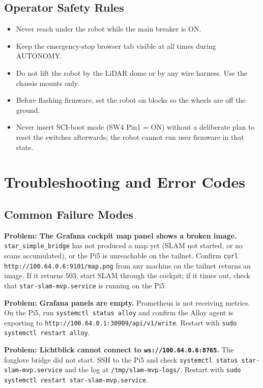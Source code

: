 \documentclass[11pt,letterpaper]{article}
\begin{document}
\subsection{Operator Safety Rules}
\begin{itemize}[leftmargin=1.4em,itemsep=2pt]
\item Never reach under the robot while the main breaker is ON.
\item Keep the emergency-stop browser tab visible at all times
      during AUTONOMY.
\item Do not lift the robot by the LiDAR dome or by any wire
      harness. Use the chassis mounts only.
\item Before flashing firmware, set the robot on blocks so the
      wheels are off the ground.
\item Never insert SCI-boot mode (SW4 Pin1 = ON) without a
      deliberate plan to reset the switches afterwards; the robot
      cannot run user firmware in that state.
\end{itemize}

\section{Troubleshooting and Error Codes}
\label{sec:trouble}

\subsection{Common Failure Modes}

\textbf{Problem: The Grafana cockpit map panel shows a broken image.}
\texttt{star\_simple\_bridge} has not produced a map yet (SLAM not
started, or no scans accumulated), or the Pi5 is unreachable on the
tailnet. Confirm
\texttt{curl http://100.64.0.6:9101/map.png} from any machine on
the tailnet returns an image. If it returns 503, start SLAM through
the cockpit; if it times out, check that
\texttt{star-slam-mvp.service} is running on the Pi5.

\textbf{Problem: Grafana panels are empty.} Prometheus is not
receiving metrics. On the Pi5, run
\texttt{systemctl status alloy} and confirm the Alloy agent is
exporting to
\texttt{http://100.64.0.1:30909/api/v1/write}. Restart with
\texttt{sudo systemctl restart alloy}.

\textbf{Problem: Lichtblick cannot connect to
\texttt{ws://100.64.0.6:8765}.} The foxglove bridge did not start.
SSH to the Pi5 and check
\texttt{systemctl status star-slam-mvp.service} and the log at
\texttt{/tmp/slam-mvp-logs/}. Restart with
\texttt{sudo systemctl restart star-slam-mvp.service}.
\end{document}
